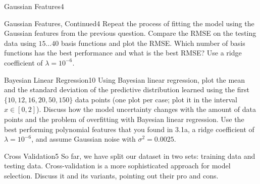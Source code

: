 \begin{questions}
\begin{question}{Gaussian Features}{4}
\begin{answer}\end{answer}

\end{question}


\begin{question}{Gaussian Features, Continued}{4}
Repeat the process of fitting the model using the Gaussian features from the previous question. Compare the RMSE on the testing data using $15 \ldots 40$ basis functions and plot the RMSE. Which number of basis functions has the best performance and what is the best RMSE? Use a ridge coefficient of $\lambda=10^{-6}$.

\begin{answer}\end{answer}

\end{question}


\begin{question}{Bayesian Linear Regression}{10}
Using Bayesian linear regression, plot the mean and the standard deviation of the predictive distribution learned using the first $\{10, 12, 16, 20, 50, 150\}$ data points (one plot per case; plot it in the interval $x\in[0,2]$).
Discuss how the model uncertainty changes with the amount of data points and the problem of overfitting with Bayesian linear regression.
Use the best performing polynomial features that you found in 3.1a, a ridge coefficient of $\lambda=10^{-6}$, and assume Gaussian noise with $\sigma^2=0.0025$. 

\begin{answer}\end{answer}
\end{question}


\begin{question}[bonus]{Cross Validation}{5}
So far, we have split our dataset in two sets: training data and testing data. Cross-validation is a more sophisticated approach for model selection. Discuss it and its variants, pointing out their pro and cons.
\end{question}

\begin{answer}\end{answer}

\end{questions}
